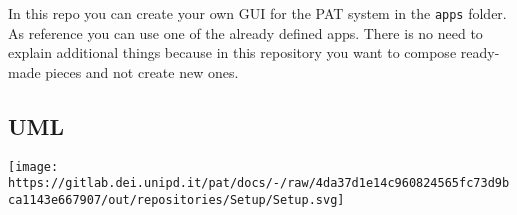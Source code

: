 In this repo you can create your own GUI for the PAT system in the
\texttt{apps} folder. As reference you can use one of the already
defined apps. There is no need to explain additional things because in
this repository you want to compose ready-made pieces and not create new
ones.

\hypertarget{uml}{%
\subsection{UML}\label{uml}}

\texttt{[image: https://gitlab.dei.unipd.it/pat/docs/-/raw/4da37d1e14c960824565fc73d9bca1143e667907/out/repositories/Setup/Setup.svg]}
